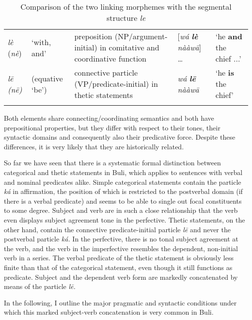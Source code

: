 \documentclass[output=paper]{langsci/langscibook}
\begin{document}
\begin{table}
\caption{Comparison of the two linking morphemes with the segmental structure \textit{le}}
\label{tab:3}


\begin{tabularx}{\textwidth}{XXXXX}
\lsptoprule

{\textit{lè} (\textit{nè}) } & {‘with, and’} & {preposition (NP/argument-initial) in comitative and coordinative function} & {[\textit{wá }\textbf{\textit{lè}}\textit{ nààw\={a}}] …} & {‘he \textbf{and} the chief ...’}\\
{\textit{l\={e} (n\={e})}} & {(equative ‘be’)} & {connective particle (VP/predicate-initial) in thetic statements} & {\textit{wá }\textbf{\textit{l\={e}}}\textit{ nààw\={a}}} & {‘he \textbf{is} the chief’}\\
\lspbottomrule
\end{tabularx}
\end{table}

Both elements share connecting/coordinating semantics and both have prepositional properties, but they differ with respect to their tones, their syntactic domains and consequently also their predicative force. Despite these differences, it is very likely that they are historically related.

So far we have seen that there is a systematic formal distinction between categorical and thetic statements in Buli, which applies to sentences with verbal and nominal predicates alike. Simple categorical statements contain the particle \textit{ká }in affirmation, the position of which is restricted to the postverbal domain (if there is a verbal predicate) and seems to be able to single out focal constituents to some degree. Subject and verb are in such a close relationship that the verb even displays subject agreement tone in the perfective. Thetic statements, on the other hand, contain the connective predicate-initial particle \textit{l\={e} }and never the postverbal particle \textit{ká. }In the perfective, there is no tonal subject agreement at the verb, and the verb in the imperfective resembles the dependent, non-initial verb in a series. The verbal predicate of the thetic statement is obviously less finite than that of the categorical statement, even though it still functions as predicate. Subject and the dependent verb form are markedly concatenated by means of the particle \textit{l\={e}.}

In the following, I outline the major pragmatic and syntactic conditions under which this marked subject-verb concatenation is very common in Buli.
\end{document}
